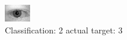 \begin{figure}[h!]
\begin{center}
\includegraphics[width=0.60\columnwidth]{figures/ID676_class_2_target_3.png}
\end{center}
\caption{ Classification: 2 actual target: 3}
\label{fig:ID676_class_2_target_3}
\end{figure}

